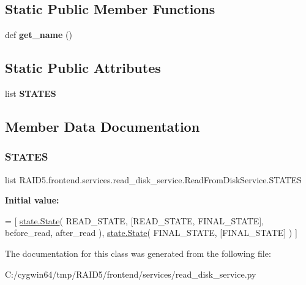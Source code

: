 \subsection*{Static Public Member Functions}
\begin{DoxyCompactItemize}
\item 
\mbox{\label{class_r_a_i_d5_1_1frontend_1_1services_1_1read__disk__service_1_1_read_from_disk_service_a0288014b9af6315bdeed89b702c4a6ca}} 
def {\bfseries get\+\_\+name} ()
\end{DoxyCompactItemize}
\subsection*{Static Public Attributes}
\begin{DoxyCompactItemize}
\item 
list {\bfseries S\+T\+A\+T\+ES}
\end{DoxyCompactItemize}


\subsection{Member Data Documentation}
\mbox{\label{class_r_a_i_d5_1_1frontend_1_1services_1_1read__disk__service_1_1_read_from_disk_service_a0d38c5ec13adcb1a772d9025fe564eac}} 
\subsubsection{\texorpdfstring{S\+T\+A\+T\+ES}{STATES}}
{\footnotesize\ttfamily list R\+A\+I\+D5.\+frontend.\+services.\+read\+\_\+disk\+\_\+service.\+Read\+From\+Disk\+Service.\+S\+T\+A\+T\+ES\hspace{0.3cm}{\ttfamily [static]}}

{\bfseries Initial value\+:}
\begin{DoxyCode}
=  [
        \hyperlink{classstate_1_1_state}{state.State}(
            READ\_STATE,
            [READ\_STATE, FINAL\_STATE],
            before\_read,
            after\_read
        ),
        \hyperlink{classstate_1_1_state}{state.State}(
            FINAL\_STATE,
            [FINAL\_STATE]
        )
    ]
\end{DoxyCode}


The documentation for this class was generated from the following file\+:\begin{DoxyCompactItemize}
\item 
C\+:/cygwin64/tmp/\+R\+A\+I\+D5/frontend/services/read\+\_\+disk\+\_\+service.\+py\end{DoxyCompactItemize}
